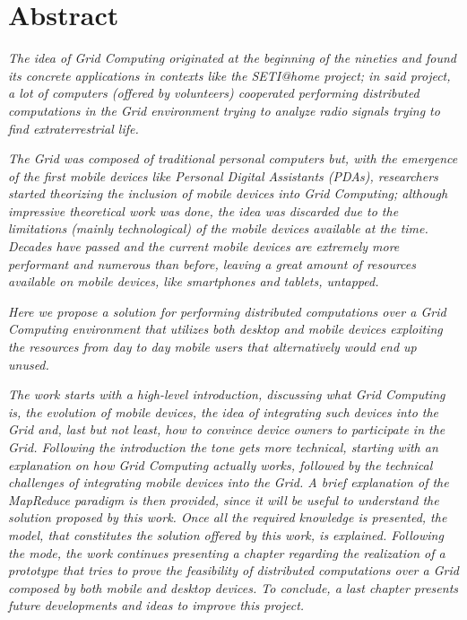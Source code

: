 \chapter*{Abstract}
\begin{spacing}{1.3}
\textit{\small
The idea of Grid Computing originated at the beginning of the nineties and found its concrete applications in contexts like the SETI@home project; in said project, a lot of computers (offered by volunteers) cooperated performing distributed computations in the Grid environment trying to analyze radio signals trying to find extraterrestrial life.
}\newline

\textit{\small
The Grid was composed of traditional personal computers but, with the emergence of the first mobile devices like Personal Digital Assistants (PDAs), researchers started theorizing the inclusion of mobile devices into Grid Computing; although impressive theoretical work was done, the idea was discarded due to the limitations (mainly technological) of the mobile devices available at the time. Decades have passed and the current mobile devices are extremely more performant and numerous than before, leaving a great amount of resources available on mobile devices, like smartphones and tablets, untapped.
}\newline

\textit{\small
Here we propose a solution for performing distributed computations over a Grid Computing environment that utilizes both desktop and mobile devices exploiting the resources from day to day mobile users that alternatively would end up unused.
}\newline

\textit{\small
The work starts with a high-level introduction, discussing what Grid Computing is, the evolution of mobile devices, the idea of integrating such devices into the Grid and, last but not least, how to convince device owners to participate in the Grid. Following the introduction the tone gets more technical, starting with an explanation on how Grid Computing actually works, followed by the technical challenges of integrating mobile devices into the Grid. A brief explanation of the MapReduce paradigm is then provided, since it will be useful to understand the solution proposed by this work. Once all the required knowledge is presented, the model, that constitutes the solution offered by this work, is explained. Following the mode, the work continues presenting a chapter regarding the realization of a prototype that tries to prove the feasibility of distributed computations over a Grid composed by both mobile and desktop devices. To conclude, a last chapter presents future developments and ideas to improve this project.
}
\end{spacing}
